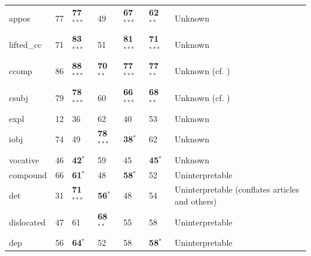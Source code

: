 \documentclass[12pt]{article}
\begin{document}
\begin{table}
\begin{center}
{\begin{tabular}{|l|l|l|ll|l|l|}
\hline
appos  &  77   &   \textbf{77}$^{***}$   &   49   &   \textbf{67}$^{***}$   &   \textbf{62}$^{**}$ &  Unknown \\%
lifted\_cc  &  71   &   \textbf{83}$^{***}$   &   51   &   \textbf{81}$^{***}$   &   \textbf{71}$^{***}$  & Unknown \\
ccomp  &  86   &   \textbf{88}$^{***}$   &   \textbf{70}$^{**}$   &   \textbf{77}$^{***}$   &   \textbf{77}$^{**}$ & Unknown (cf. \cite{dryer1980positional}) \\ %
csubj  &  79   &   \textbf{78}$^{***}$   &   60   &   \textbf{66}$^{***}$   &   \textbf{68}$^{**}$  & Unknown (cf. \cite{dryer1980positional}) \\%
expl  &  12   &   36   &   62   &   40   &   53  & Unknown \\
iobj  &  74   &   49   &   \textbf{78}$^{***}$   &   \textbf{38}$^{*}$   &   62  & Unknown \\
vocative  &  46   &   \textbf{42}$^{*}$   &   59   &   45   &   \textbf{45}$^{*}$  & Unknown \\

\hline
compound  &  66   &   \textbf{61}$^{*}$   &   48   &   \textbf{58}$^{*}$   &   52  & Uninterpretable \\
det  &  31   &   \textbf{71}$^{***}$   &   \textbf{56}$^{*}$   &   48   &   54  & Uninterpretable (conflates articles and others) \\%
dislocated  &  47   &   61   &   \textbf{68}$^{**}$   &   55   &   58  & Uninterpretable \\
dep  &  56   &   \textbf{64}$^{*}$   &   52   &   58   &   \textbf{58}$^{*}$   & Uninterpretable \\


\end{tabular}}
\end{center}
\end{table}
\end{document}
